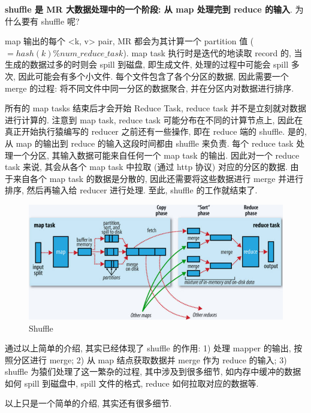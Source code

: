 \textbf{shuffle 是 MR 大数据处理中的一个阶段: 从 map 处理完到 reduce 的输入}. 为什么要有 shuffle 呢?

map 输出的每个 <k, v> pair, MR 都会为其计算一个 partition 值 ($=hash(k) \% num\_reduce\_task$). map task 执行时是迭代的地读取 record 的, 当生成的数据过多的时则会 spill 到磁盘, 即生成文件, 处理的过程中可能会 spill 多次, 因此可能会有多个小文件. 每个文件包含了各个分区的数据, 因此需要一个 merge 的过程: 将不同文件中同一分区的数据聚合, 并在分区内对数据进行排序.

所有的 map tasks 结束后才会开始 Reduce Task, reduce task 并不是立刻就对数据进行计算的. 注意到 map task, reduce task 可能分布在不同的计算节点上, 因此在真正开始执行猿编写的 reducer 之前还有一些操作, 即在 reduce 端的 shuffle. 是的, 从 map 的输出到 reduce 的输入这段时间都由 shuffle 来负责. 每个 reduce task 处理一个分区, 其输入数据可能来自任何一个 map task 的输出. 因此对一个 reduce task 来说, 其会从各个 map task 中拉取 (通过 http 协议) 对应的分区的数据. 由于来自各个 map task 的数据是分散的, 因此还需要将这些数据进行 merge 并进行排序, 然后再输入给 reducer 进行处理. 至此, shuffle 的工作就结束了. 

\begin{figure}[h]
	\centering
	\includegraphics[width=.95\textwidth]{pics/mr_shuffle.jpg}
	\caption{Shuffle}
	\label{fig:mr-shuffle}
\end{figure}

通过以上简单的介绍, 其实已经体现了 shuffle 的作用: 1) 处理 mapper 的输出, 按照分区进行 merge; 2) 从 map 结点获取数据并 merge 作为 reduce 的输入; 3) shuffle 为猿们处理了这一繁杂的过程, 其中涉及到很多细节, 如内存中缓冲的数据如何 spill 到磁盘中, spill 文件的格式, reduce 如何拉取对应的数据等.

以上只是一个简单的介绍, 其实还有很多细节.